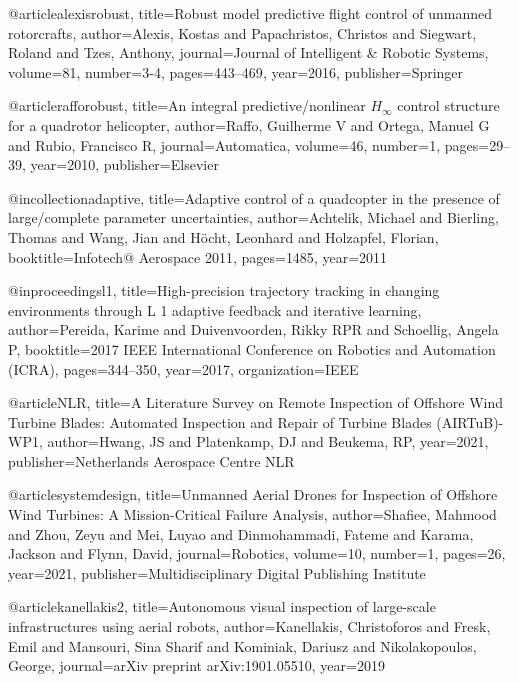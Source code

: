 \begin{thebibliography}{9}
@article{alexisrobust,
  title={Robust model predictive flight control of unmanned rotorcrafts},
  author={Alexis, Kostas and Papachristos, Christos and Siegwart, Roland and Tzes, Anthony},
  journal={Journal of Intelligent \& Robotic Systems},
  volume={81},
  number={3-4},
  pages={443--469},
  year={2016},
  publisher={Springer}
}

@article{rafforobust,
  title={An integral predictive/nonlinear $H_{\infty}$ control structure for a quadrotor helicopter},
  author={Raffo, Guilherme V and Ortega, Manuel G and Rubio, Francisco R},
  journal={Automatica},
  volume={46},
  number={1},
  pages={29--39},
  year={2010},
  publisher={Elsevier}
}



@incollection{adaptive,
  title={Adaptive control of a quadcopter in the presence of large/complete parameter uncertainties},
  author={Achtelik, Michael and Bierling, Thomas and Wang, Jian and H{\"o}cht, Leonhard and Holzapfel, Florian},
  booktitle={Infotech@ Aerospace 2011},
  pages={1485},
  year={2011}
}

@inproceedings{l1,
  title={High-precision trajectory tracking in changing environments through L 1 adaptive feedback and iterative learning},
  author={Pereida, Karime and Duivenvoorden, Rikky RPR and Schoellig, Angela P},
  booktitle={2017 IEEE International Conference on Robotics and Automation (ICRA)},
  pages={344--350},
  year={2017},
  organization={IEEE}
}


@article{NLR,
  title={A Literature Survey on Remote Inspection of Offshore Wind Turbine Blades: Automated Inspection and Repair of Turbine Blades (AIRTuB)-WP1},
  author={Hwang, JS and Platenkamp, DJ and Beukema, RP},
  year={2021},
  publisher={Netherlands Aerospace Centre NLR}
}


@article{systemdesign,
  title={Unmanned Aerial Drones for Inspection of Offshore Wind Turbines: A Mission-Critical Failure Analysis},
  author={Shafiee, Mahmood and Zhou, Zeyu and Mei, Luyao and Dinmohammadi, Fateme and Karama, Jackson and Flynn, David},
  journal={Robotics},
  volume={10},
  number={1},
  pages={26},
  year={2021},
  publisher={Multidisciplinary Digital Publishing Institute}
}

@article{kanellakis2,
  title={Autonomous visual inspection of large-scale infrastructures using aerial robots},
  author={Kanellakis, Christoforos and Fresk, Emil and Mansouri, Sina Sharif and Kominiak, Dariusz and Nikolakopoulos, George},
  journal={arXiv preprint arXiv:1901.05510},
  year={2019}
}


\end{thebibliography}
